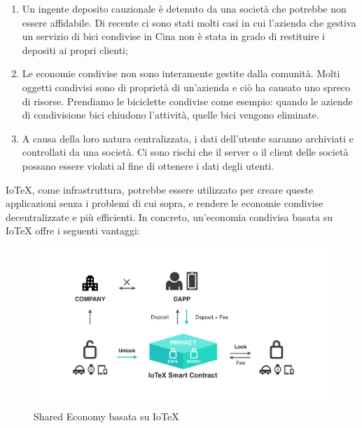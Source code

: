 \begin{enumerate}
    \item Un ingente deposito cauzionale è detenuto da una società che potrebbe non essere affidabile. Di recente ci sono stati molti casi in cui l'azienda che gestiva un servizio di bici condivise in Cina non è stata in grado di restituire i depositi ai propri clienti;

    \item Le economie condivise non sono interamente gestite dalla comunità. Molti oggetti condivisi sono di proprietà di un'azienda e ciò ha causato uno spreco di risorse. Prendiamo le biciclette condivise come esempio: quando le aziende di condivisione bici chiudono l'attività, quelle bici vengono eliminate.

    \item A causa della loro natura centralizzata, i dati dell'utente saranno archiviati e controllati da una società. Ci sono rischi che il server o il client delle società possano essere violati al fine di ottenere i dati degli utenti.
\end{enumerate}

IoTeX, come infrastruttura, potrebbe essere utilizzato per creare queste applicazioni senza i problemi di cui sopra, e rendere le economie condivise decentralizzate e più efficienti. In concreto, un'economia condivisa basata su IoTeX offre i seguenti vantaggi:

\begin{figure}[ht]
    \centering
    \includegraphics[width=\textwidth]{Figura7}
    \caption{Shared Economy basata su IoTeX}
    \label{fig:Figura7}
\end{figure}

